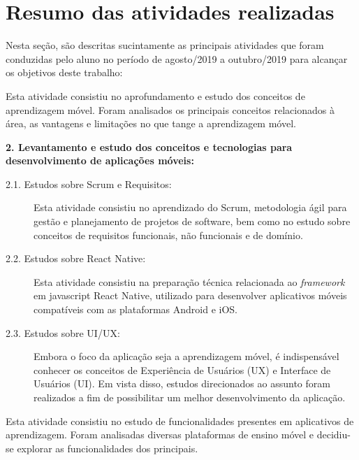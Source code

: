 \chapter{Resumo das atividades realizadas} \label{sec:resumo_ativ}
Nesta seção, são descritas sucintamente as principais atividades que foram conduzidas pelo aluno no período de agosto/2019 a outubro/2019 para alcançar os objetivos deste trabalho:

\begin{description}
\item[1. Estudo sobre Aprendizagem móvel:] Esta atividade consistiu no aprofundamento e estudo dos conceitos de aprendizagem móvel. Foram analisados os principais conceitos relacionados à área, as vantagens e limitações no que tange a aprendizagem móvel. 

\item \textbf{2. Levantamento e estudo dos conceitos e tecnologias para desenvolvimento de aplicações móveis:}
 

\begin{description}
\item[2.1. Estudos sobre Scrum e Requisitos:] Esta atividade consistiu no aprendizado do Scrum, metodologia ágil para gestão e planejamento de projetos de software, bem como no estudo sobre conceitos de requisitos funcionais, não funcionais e de domínio.

\item[2.2. Estudos sobre React Native:] Esta atividade consistiu na preparação técnica relacionada ao \textit{framework} em javascript React Native, utilizado para desenvolver aplicativos móveis compatíveis com as plataformas Android e iOS.

\item[2.3. Estudos sobre UI/UX:] Embora o foco da aplicação seja a aprendizagem móvel, é indispensável conhecer os conceitos de Experiência de Usuários (UX) e Interface de Usuários (UI). Em vista disso, estudos direcionados ao assunto foram realizados a fim de possibilitar um melhor desenvolvimento da aplicação.


\end{description}

\item[3. Pesquisa sobre as principais funcionalidades de aplicativos de aprendizagem móvel:] Esta atividade consistiu no estudo de funcionalidades presentes em aplicativos de aprendizagem. Foram analisadas diversas plataformas de ensino móvel e decidiu-se explorar as funcionalidades dos principais.


\end{description}

